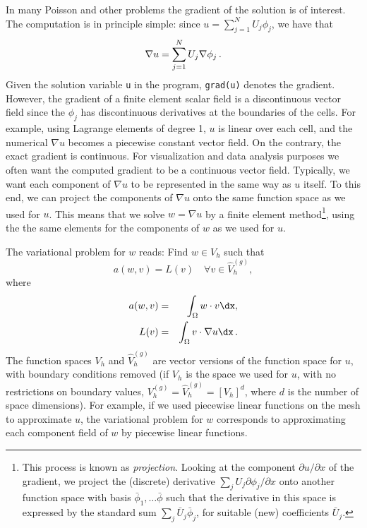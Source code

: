 In many Poisson and other problems the gradient of the solution is
of interest. The computation is in principle simple:
since
$u = \sum_{j=1}^N U_j \phi_j$, we have that
\[ \nabla u = \sum_{j=1}^N U_j \nabla \phi_j\thinspace .\]
Given the solution variable {\fontsize{12pt}{12pt}\texttt{u}} in the program, {\fontsize{12pt}{12pt}\texttt{grad(u)}} denotes
the gradient. However, the gradient of a finite element scalar field
is a discontinuous vector field
since the $\phi_j$ has discontinuous derivatives at the boundaries of
the cells. For example, using Lagrange elements of degree 1, $u$ is
linear over each cell, and the numerical $\nabla u$ becomes a piecewise
constant vector field. On the contrary,
the exact gradient is continuous.
For visualization and data analysis purposes
we often want the computed
gradient to be a continuous vector field. Typically,
we want each component of $\nabla u$ to be represented in the same
way as $u$ itself. To this end, we can project the components
of $\nabla u$ onto the
same function space as we used for $u$.
This means that we solve $w = \nabla u$ by a finite element
method\footnote{This process is known as \emph{projection}.
Looking at the component $\partial u/\partial x$ of the gradient, we project
the (discrete) derivative
$\sum_jU_j{\partial \phi_j/\partial x}$ onto another function space
with basis $\bar\phi_1,\ldots\bar\phi$ such that the derivative in
this space is expressed by the standard sum
$\sum_j\bar U_j\bar \phi_j$, for suitable (new)
coefficients $\bar U_j$.},
using the the same elements for the components of $w$ as we used for $u$.

The variational problem for $w$ reads: Find  $w\in V_h$ such that
\begin{equation}
a(w, v) = L(v)\quad\forall v\in \hat{V}_h^{(g)},
\end{equation}
where
\begin{eqnarray}
a(w, v) &=& \int_\Omega w\cdot v\dx,\\
L(v) &=& \int_\Omega v\cdot \nabla u\dx\langtangenep
\end{eqnarray}
The function spaces $V_h$ and $\hat{V}_h^{(g)}$ are
vector versions of the function space for $u$, with
boundary conditions removed (if $V_h$ is the
space we used for $u$, with no restrictions
on boundary values, $ V^{(g)}_h = \hat{V}_h^{(g)} = [V_h]^d$, where
$d$ is the number of space dimensions).
For example, if we used piecewise linear functions on the mesh to
approximate $u$, the variational problem for $w$ corresponds to
approximating each component field of $w$ by piecewise linear functions.

